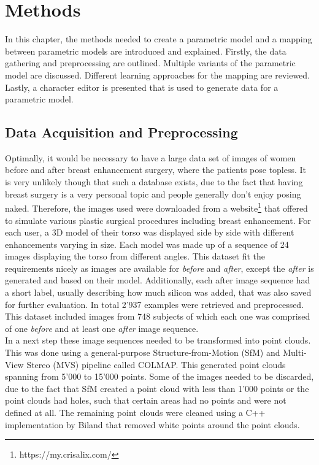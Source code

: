\chapter{Methods}
In this chapter, the methods needed to create a parametric model and  a mapping between parametric models are introduced and explained. Firstly, the data gathering and preprocessing are outlined. Multiple variants of the parametric model are discussed. Different learning approaches for the mapping are reviewed. Lastly, a character editor is presented that is used to generate data for a parametric model.

\section{Data Acquisition and Preprocessing}
Optimally, it would be necessary to have a large data set of images of women before and after breast enhancement surgery, where the patients pose topless. It is very unlikely though that such a database exists, due to the fact that having breast surgery is a very personal topic and people generally don't enjoy posing naked. Therefore, the images used were downloaded from a website\footnote{https://my.crisalix.com/} that offered to simulate various plastic surgical procedures including breast enhancement. For each user, a 3D model of their torso was displayed side by side with different enhancements varying in size. Each model was made up of a sequence of 24 images displaying the torso from different angles. This dataset fit the requirements nicely as images are available for \textit{before} and \textit{after}, except the \textit{after} is generated and based on their model. Additionally, each after image sequence had a short label, usually describing how much silicon was added, that was also saved for further evaluation. In total 2'937 examples were retrieved and preprocessed. This dataset included images from 748 subjects of which each one was comprised of one \textit{before} and at least one \textit{after} image sequence.\\

In a next step these image sequences needed to be transformed into point clouds. This was done using a general-purpose Structure-from-Motion (SfM) \cite{schoenberger2016sfm} and Multi-View Stereo (MVS) \cite{schoenberger2016mvs} pipeline called COLMAP. This generated point clouds spanning from 5'000 to 15'000 points. Some of the images needed to be discarded, due to the fact that SfM created a point cloud with less than 1'000 points or the point clouds had holes, such that certain areas had no points and were not defined at all. The remaining point clouds were cleaned using a C++ implementation by Biland \cite{Biland17} that removed white points around the point clouds.

